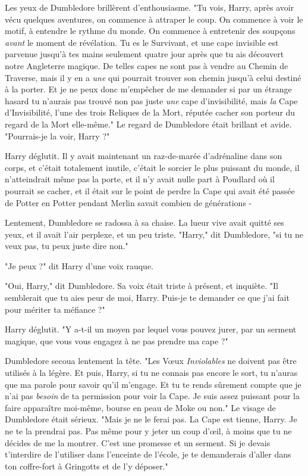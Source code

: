 Les yeux de Dumbledore brillèrent d'enthousiasme. "Tu vois, Harry, après avoir vécu quelques aventures, on commence à attraper le coup. On commence à voir le motif, à entendre le rythme du monde. On commence à entretenir des soupçons \emph{avant}  le moment de révélation. Tu es le Survivant, et une cape invisible est parvenue jusqu'à tes mains seulement quatre jour après que tu ais découvert notre Angleterre magique. De telles capes ne sont pas à vendre au Chemin de Traverse, mais il y en a \emph{une}  qui pourrait trouver son chemin jusqu'à celui destiné à la porter. Et je ne peux donc m'empêcher de me demander si par un étrange hasard tu n'aurais pas trouvé non pas juste \emph{une}  cape d'invisibilité, mais \emph{la}  Cape d'Invisibilité, l'une des trois Reliques de la Mort, réputée cacher son porteur du regard de la Mort elle-même." Le regard de Dumbledore était brillant et avide. "Pourrais-je la voir, Harry ?"

Harry déglutit. Il y avait maintenant un raz-de-marée d'adrénaline dans son corps, et c'était totalement inutile, c'était le sorcier le plus puissant du monde, il n'atteindrait même pas la porte, et il n'y avait nulle part à Poudlard où il pourrait se cacher, et il était sur le point de perdre la Cape qui avait été passée de Potter en Potter pendant Merlin savait combien de générations -

Lentement, Dumbledore se radossa à sa chaise. La lueur vive avait quitté ses yeux, et il avait l'air perplexe, et un peu triste. "Harry," dit Dumbledore, "si tu ne veux pas, tu peux juste dire non."

"Je peux ?" dit Harry d'une voix rauque.

"Oui, Harry," dit Dumbledore. Sa voix était triste à présent, et inquiète. "Il semblerait que tu aies peur de moi, Harry. Puis-je te demander ce que j'ai fait pour mériter ta méfiance ?"

Harry déglutit. "Y a-t-il un moyen par lequel vous pouvez jurer, par un serment magique, que vous vous engagez à ne pas prendre ma cape ?"

Dumbledore secoua lentement la tête. "Les Vœux\emph{ Inviolables } ne doivent pas être utilisés à la légère. Et puis, Harry, si tu ne connais pas encore le sort, tu n'auras que ma parole pour savoir qu'il m'engage. Et tu te rends sûrement compte que je n'ai pas \emph{besoin}  de ta permission pour voir la Cape. Je suis assez puissant pour la faire apparaître moi-même, bourse en peau de Moke ou non." Le visage de Dumbledore était sérieux. "Mais je ne le ferai pas. La Cape est tienne, Harry. Je ne te la prendrai pas. Pas même pour y jeter un coup d'œil, à moins que tu ne décides de me la montrer. C'est une promesse et un serment. Si je devais t'interdire de l'utiliser dans l'enceinte de l'école, je te demanderais d'aller dans ton coffre-fort à Gringotts et de l'y déposer."

